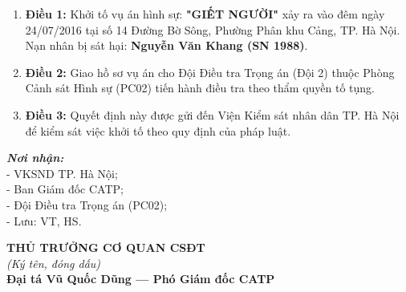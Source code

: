 \documentclass[12pt,a4paper]{article}
\begin{document}
\begin{enumerate}[label=\arabic*., leftmargin=*, itemsep=2pt, topsep=2pt, parsep=0pt]
  \item \textbf{Điều 1:} Khởi tố vụ án hình sự: \textbf{"GIẾT NGƯỜI"} xảy ra vào đêm ngày 24/07/2016 tại số 14 Đường Bờ Sông, Phường Phân khu Cảng, TP. Hà Nội. Nạn nhân bị sát hại: \textbf{Nguyễn Văn Khang (SN 1988)}.
  \item \textbf{Điều 2:} Giao hồ sơ vụ án cho Đội Điều tra Trọng án (Đội 2) thuộc Phòng Cảnh sát Hình sự (PC02) tiến hành điều tra theo thẩm quyền tố tụng.
  \item \textbf{Điều 3:} Quyết định này được gửi đến Viện Kiểm sát nhân dân TP. Hà Nội để kiểm sát việc khởi tố theo quy định của pháp luật.


\end{enumerate}
\vspace{0.8cm}
\noindent
\begin{minipage}[t]{0.45\textwidth}
    \textbf{\textit{Nơi nhận:}}\\[0.15cm]
    \fontsize{10pt}{12pt}\selectfont
    - VKSND TP. Hà Nội;\\
    - Ban Giám đốc CATP;\\
    - Đội Điều tra Trọng án (PC02);\\
    - Lưu: VT, HS.
\end{minipage}
\hfill
\begin{minipage}[t]{0.50\textwidth}
    \begin{center}
        \textbf{THỦ TRƯỞNG CƠ QUAN CSĐT}\\[0.1cm]
        \textit{(Ký tên, đóng dấu)}\\[1.6cm]
        \textbf{Đại tá Vũ Quốc Dũng — Phó Giám đốc CATP}
    \end{center}
\end{minipage}
\end{document}
